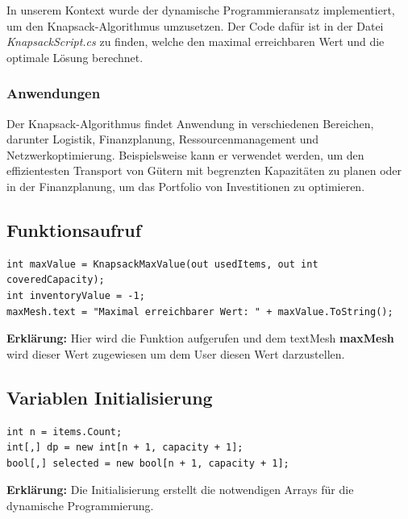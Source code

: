 In unserem Kontext wurde der dynamische Programmieransatz implementiert, um den Knapsack-Algorithmus umzusetzen.
Der Code dafür ist in der Datei \textit{KnapsackScript.cs} zu finden, welche den maximal erreichbaren Wert und
die optimale Lösung berechnet.

\subsubsection{Anwendungen}
Der Knapsack-Algorithmus findet Anwendung in verschiedenen Bereichen, darunter Logistik, Finanzplanung,
Ressourcenmanagement und Netzwerkoptimierung. Beispielsweise kann er verwendet werden, um den effizientesten
Transport von Gütern mit begrenzten Kapazitäten zu planen oder in der Finanzplanung, um das Portfolio von
Investitionen zu optimieren.

\subsection*{Funktionsaufruf}
\begin{lstlisting}[style=csharp, caption={}, label=code:init]
int maxValue = KnapsackMaxValue(out usedItems, out int coveredCapacity);
int inventoryValue = -1;
maxMesh.text = "Maximal erreichbarer Wert: " + maxValue.ToString();
\end{lstlisting}
\textbf{Erklärung:} Hier wird die Funktion aufgerufen und dem textMesh \textbf{maxMesh} wird dieser Wert zugewiesen um dem User diesen Wert darzustellen.\\

\subsection*{Variablen Initialisierung}
\begin{lstlisting}[style=csharp, caption={}, label=code:variable]
int n = items.Count;
int[,] dp = new int[n + 1, capacity + 1];
bool[,] selected = new bool[n + 1, capacity + 1];
\end{lstlisting}
\textbf{Erklärung:} Die Initialisierung erstellt die notwendigen Arrays für die dynamische Programmierung.\\


